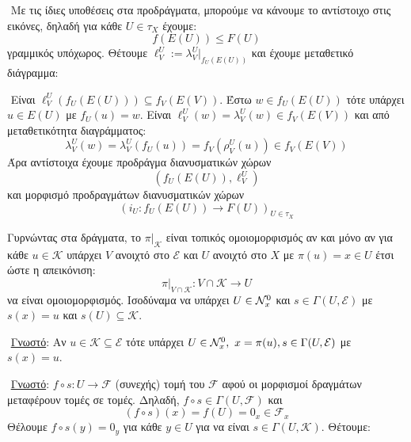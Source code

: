 $ $\newline
Με τις ίδιες υποθέσεις στα προδράγματα, μπορούμε να κάνουμε το αντίστοιχο στις εικόνες, δηλαδή για κάθε $U \in \tau_X$ έχουμε:
$$f(E(U))\leq F(U)$$ γραμμικός υπόχωρος. Θέτουμε $\ell^U_V := \lambda^U_V |_{f_U(E(U))}$ και έχουμε μεταθετικό διάγραμμα:


\begin{figure}[H]
    \centering
\end{figure}


$ $\newline
Είναι $\ell^U_V (f_U(E(U))) \subseteq f_V(E(V))$. Έστω $w \in f_U(E(U))$ τότε υπάρχει $u \in E(U)$ με $f_U(u) = w$. Είναι $\ell^U_V(w) = \lambda^U_V(w) \in f_V(E(V))$ και από μεταθετικότητα διαγράμματος:
$$\lambda^U_V(w) = \lambda^U_V(f_U(u)) = f_V(\rho^U_V(u)) \in f_V(E(V))$$ Άρα αντίστοιχα έχουμε προδράγμα διανυσματικών χώρων 
$$(f_U(E(U)), \ell^U_V)$$ και μορφισμό προδραγμάτων διανυσματικών χώρων
$$(i_U: f_U(E(U))\longrightarrow F(U))_{U\in\tau_X}$$

\vspace*{0.3cm}
\noindent Γυρνώντας στα δράγματα, το $\pi|_{\mathcal{K}}$ είναι τοπικός ομοιομορφισμός αν και μόνο αν για κάθε $u \in \mathcal{K}$ υπάρχει $V$ ανοιχτό στο $\mathcal{E}$ και $U$ ανοιχτό στο $X$ με $\pi(u)=x \in U$ έτσι ώστε η απεικόνιση:
$$\pi|_{V\cap \mathcal{K}}: V\cap \mathcal{K}\longrightarrow U$$ να είναι ομοιομορφισμός. Ισοδύναμα να υπάρχει $U\in\mathcal{N}^0_x$ και $s\in \Gamma(U,\mathcal{E})$ με $s(x) = u$ και $s(U)\subseteq \mathcal{K}$.

$ $\newline
\underline{Γνωστό}: Αν $u \in \mathcal{K} \subseteq \mathcal{E}$ τότε υπάρχει $U\in \mathcal{N}^0_x, \ x= \pi(u), s \in \Gamma(U,\mathcal{E})$ με $s(x) = u$.

$ $\newline
\underline{Γνωστό}: $f\circ s:U\longrightarrow \mathcal{F}$ (συνεχής) τομή του $\mathcal{F}$ αφού οι μορφισμοί δραγμάτων μεταφέρουν τομές σε τομές. Δηλαδή, $f\circ s \in \Gamma(U,\mathcal{F})$ και
$$(f \circ s)(x) = f(U)  = 0_x \in \mathcal{F}_x$$ Θέλουμε $f\circ s(y) = 0_y$ για κάθε $y \in U$ για να είναι $s \in \Gamma(U,\mathcal{K})$. Θέτουμε:

